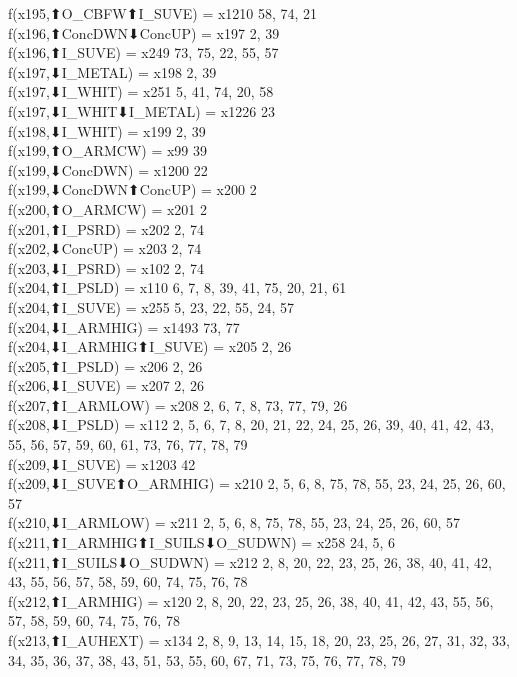 f(x195,⬆O_CBFW⬆I_SUVE) = x1210 {58, 74, 21} \\
f(x196,⬆ConcDWN⬇ConcUP) = x197 {2, 39} \\
f(x196,⬆I_SUVE) = x249 {73, 75, 22, 55, 57} \\
f(x197,⬇I_METAL) = x198 {2, 39} \\
f(x197,⬇I_WHIT) = x251 {5, 41, 74, 20, 58} \\
f(x197,⬇I_WHIT⬇I_METAL) = x1226 {23} \\
f(x198,⬇I_WHIT) = x199 {2, 39} \\
f(x199,⬆O_ARMCW) = x99 {39} \\
f(x199,⬇ConcDWN) = x1200 {22} \\
f(x199,⬇ConcDWN⬆ConcUP) = x200 {2} \\
f(x200,⬆O_ARMCW) = x201 {2} \\
f(x201,⬆I_PSRD) = x202 {2, 74} \\
f(x202,⬇ConcUP) = x203 {2, 74} \\
f(x203,⬇I_PSRD) = x102 {2, 74} \\
f(x204,⬆I_PSLD) = x110 {6, 7, 8, 39, 41, 75, 20, 21, 61} \\
f(x204,⬆I_SUVE) = x255 {5, 23, 22, 55, 24, 57} \\
f(x204,⬇I_ARMHIG) = x1493 {73, 77} \\
f(x204,⬇I_ARMHIG⬆I_SUVE) = x205 {2, 26} \\
f(x205,⬆I_PSLD) = x206 {2, 26} \\
f(x206,⬇I_SUVE) = x207 {2, 26} \\
f(x207,⬆I_ARMLOW) = x208 {2, 6, 7, 8, 73, 77, 79, 26} \\
f(x208,⬇I_PSLD) = x112 {2, 5, 6, 7, 8, 20, 21, 22, 24, 25, 26, 39, 40, 41, 42, 43, 55, 56, 57, 59, 60, 61, 73, 76, 77, 78, 79} \\
f(x209,⬇I_SUVE) = x1203 {42} \\
f(x209,⬇I_SUVE⬆O_ARMHIG) = x210 {2, 5, 6, 8, 75, 78, 55, 23, 24, 25, 26, 60, 57} \\
f(x210,⬇I_ARMLOW) = x211 {2, 5, 6, 8, 75, 78, 55, 23, 24, 25, 26, 60, 57} \\
f(x211,⬆I_ARMHIG⬆I_SUILS⬇O_SUDWN) = x258 {24, 5, 6} \\
f(x211,⬆I_SUILS⬇O_SUDWN) = x212 {2, 8, 20, 22, 23, 25, 26, 38, 40, 41, 42, 43, 55, 56, 57, 58, 59, 60, 74, 75, 76, 78} \\
f(x212,⬆I_ARMHIG) = x120 {2, 8, 20, 22, 23, 25, 26, 38, 40, 41, 42, 43, 55, 56, 57, 58, 59, 60, 74, 75, 76, 78} \\
f(x213,⬆I_AUHEXT) = x134 {2, 8, 9, 13, 14, 15, 18, 20, 23, 25, 26, 27, 31, 32, 33, 34, 35, 36, 37, 38, 43, 51, 53, 55, 60, 67, 71, 73, 75, 76, 77, 78, 79} \\

